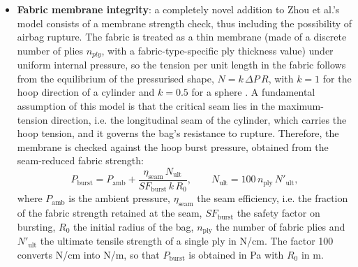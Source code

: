 \begin{itemize}
  \item \textbf{Fabric membrane integrity}: a completely novel addition to Zhou et al.'s model consists of a membrane strength check, thus including the possibility of airbag rupture. The fabric is treated as a thin membrane (made of a discrete number of plies $n_{ply}$, with a fabric-type-specific ply thickness value) under uniform internal pressure, so the tension per unit length in the fabric follows from the equilibrium of the pressurised shape, $N = k\,\Delta P\,R$, with $k = 1$ for the hoop direction of a cylinder and $k = 0.5$ for a sphere \cite{Sinclair2015}. A fundamental assumption of this model is that the critical seam lies in the maximum-tension direction, i.e. the longitudinal seam of the cylinder, which carries the hoop tension, and it governs the bag's resistance to rupture. Therefore, the membrane is checked against the hoop burst pressure, obtained from the seam-reduced fabric strength:
  \begin{equation}\label{eq:burst_pressure}
    P_\text{burst} = P_\text{amb} + \frac{\eta_\text{seam}\,N_\text{ult}}{\mathit{SF}_\text{burst}\,k\,R_0},
    \qquad N_\text{ult} = 100\,n_\text{ply}\,N'_\text{ult},
  \end{equation}
  where $P_\text{amb}$ is the ambient pressure, $\eta_\text{seam}$ the seam efficiency, i.e. the fraction of the fabric strength retained at the seam, $\mathit{SF}_\text{burst}$ the safety factor on bursting, $R_0$ the initial radius of the bag, $n_\text{ply}$ the number of fabric plies and $N'_\text{ult}$ the ultimate tensile strength of a single ply in N/cm. The factor 100 converts N/cm into N/m, so that $P_\text{burst}$ is obtained in Pa with $R_0$ in m.
\end{itemize}

